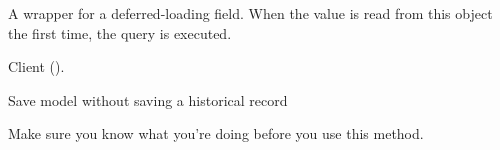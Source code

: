 \documentclass[letterpaper,10pt,english]{sphinxmanual}
\begin{document}
\begin{fulllineitems}
\begin{fulllineitems}
\label{\detokenize{modules/models:gestion.models.MenuHistory.paymentMethod_id}}
A wrapper for a deferred-loading field. When the value is read from this
object the first time, the query is executed.

\end{fulllineitems}


\begin{fulllineitems}
\label{\detokenize{modules/models:gestion.models.MenuHistory.quantity}}
Client ().

\end{fulllineitems}


\begin{fulllineitems}
\label{\detokenize{modules/models:gestion.models.MenuHistory.save_without_historical_record}}
Save model without saving a historical record

Make sure you know what you’re doing before you use this method.

\end{fulllineitems}


\end{fulllineitems}

\end{document}
